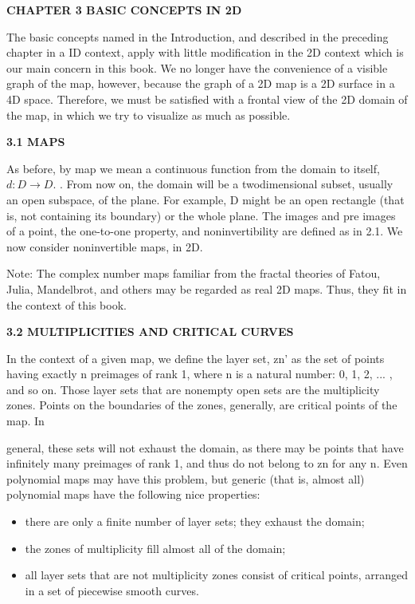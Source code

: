 \documentclass{article}
\begin{document}
\textbf{CHAPTER 3
BASIC CONCEPTS IN 2D}

\hfill

The basic concepts named in the Introduction, and described in
the preceding chapter in a ID context, apply with little modification
in the 2D context which is our main concern in this book. We no
longer have the convenience of a visible graph of the map, however,
because the graph of a 2D map is a 2D surface in a 4D space.
Therefore, we must be satisfied with a frontal view of the 2D
domain of the map, in which we try to visualize as much as
possible.

\hfill

\textbf{3.1 MAPS}

\hfill


As before, by map we mean a continuous function from the
domain to itself, $d:D \to D$. . From now on, the domain will be a twodimensional
subset, usually an open subspace, of the plane. For
example, D might be an open rectangle (that is, not containing its
boundary) or the whole plane. The images and pre images of a
point, the one-to-one property, and noninvertibility are defined as in
2.1. We now consider noninvertible maps, in 2D.

\hfill

Note: The complex number maps familiar from the fractal theories
of Fatou, Julia, Mandelbrot, and others may be regarded as real
2D maps. Thus, they fit in the context of this book.

\hfill

\textbf{3.2 MULTIPLICITIES AND CRITICAL CURVES}

\hfill

In the context of a given map, we define the layer set, zn' as the
set of points having exactly n preimages of rank 1, where n is a natural
number: 0, 1, 2, ... , and so on. Those layer sets that are
nonempty open sets are the multiplicity zones. Points on the boundaries
of the zones, generally, are critical points of the map. In

general, these sets will not exhaust the domain, as there may be
points that have infinitely many preimages of rank 1, and thus do
not belong to zn for any n. Even polynomial maps may have this
problem, but generic (that is, almost all) polynomial maps have the
following nice properties:

\begin{itemize}
\item there are only a finite number of layer sets;
they exhaust the domain;
\item the zones of multiplicity fill almost all of the domain;
\item all layer sets that are not multiplicity zones consist of critical
points, arranged in a set of piecewise smooth curves.
\end{itemize}
\end{document}

